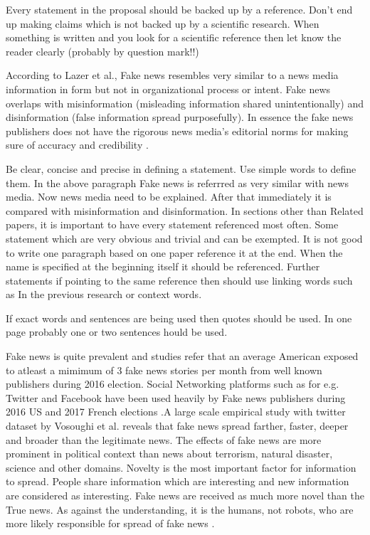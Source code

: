 \documentclass[a4paper, 11pt]{article}
\begin{document}
\color{red}
Every statement in the proposal should be backed up by a reference. Don't end up making claims which is not backed up by a scientific research. When something is written and you look for a scientific reference then let know the reader clearly (probably by question mark!!)
\color{black}

According to Lazer et al., Fake news resembles very similar to a news media information in form but not in organizational process or intent. Fake news overlaps with misinformation (misleading information shared unintentionally) and disinformation (false information spread purposefully). In essence the fake news publishers does not have the rigorous news media's editorial norms for making sure of accuracy and credibility \cite{Lazer1094}. 

\color{red}
Be clear, concise and precise in defining a statement. Use simple words to define them. In the above paragraph Fake news is referrred as very similar with news media. Now news media need to be explained. After that immediately it is compared with misinformation and disinformation. In sections other than Related papers, it is important to have every statement referenced most often. Some statement which are very obvious and trivial and can be exempted. It is not good to write one paragraph based on one paper reference it at the end. When the name is specified at the beginning itself it should be referenced. Further statements if pointing to the same reference then should use linking words such as In the previous research or context words.

If exact words and sentences are being used then quotes should be used. In one page probably one or two sentences hould be used.
\color{black}

Fake news is quite prevalent and studies refer that an average American exposed to atleast a mimimum of 3 fake news stories per month from well known publishers during 2016 election. Social Networking platforms such as for e.g. Twitter and Facebook have been used heavily by Fake news publishers during 2016 US and 2017 French elections \cite{Lazer1094}.A large scale empirical study with twitter dataset by Vosoughi et al. reveals that fake news spread farther, faster, deeper and broader than the legitimate news. The effects of fake news are more prominent in political context than news about terrorism, natural disaster, science and other domains. Novelty is the most important factor for information to spread. People share information which are interesting and new information are considered as interesting. Fake news are received as much more novel than the True news. As against the understanding, it is the humans, not robots, who are more likely responsible for spread of fake news \cite{Vosoughi1146}.
\end{document}
